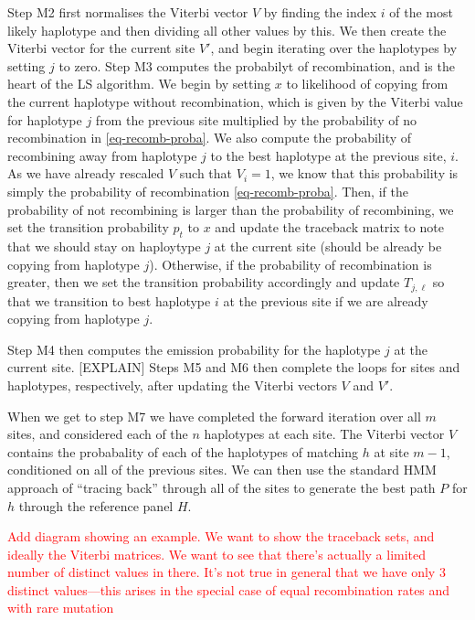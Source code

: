 \documentclass{article}
\begin{document}
Step M2 first normalises the Viterbi vector $V$ by finding the index $i$
of the most likely haplotype and then dividing all other values by this. We
then create the Viterbi vector for the current site $V'$, and begin
iterating over the haplotypes by setting $j$ to zero. Step M3 computes
the probabilyt of recombination, and is the heart of the LS algorithm.
We begin by setting $x$ to likelihood of copying from the current
haplotype without recombination, which is given by the Viterbi value
for haplotype $j$ from the previous site multiplied by the
probability of no recombination in \eqref{eq-recomb-proba}. We also
compute the probability of recombining away from haplotype $j$
to the best haplotype at the previous site, $i$. As we have already
rescaled $V$ such that $V_i = 1$, we know that this probability is
simply the probability of recombination \eqref{eq-recomb-proba}. Then,
if the probability of not recombining is larger than the probability
of recombining, we set the transition probability $p_t$ to $x$
and update the traceback matrix to note that we should stay on haploytype
$j$ at the current site (should be already be copying from haplotype $j$).
Otherwise, if the probability of recombination is greater, then we set the
transition probability accordingly and update $T_{j, \ell}$ so that we
transition to best haplotype $i$ at the previous site if we are already
copying from haplotype $j$.

Step M4 then computes the emission probability for the haplotype $j$
at the current site. [EXPLAIN] Steps M5 and M6 then complete the loops
for sites and haplotypes, respectively, after updating the Viterbi
vectors $V$ and $V'$.

When we get to step M7 we have completed the forward iteration over
all $m$ sites, and considered each of the $n$ haplotypes at each site.
The Viterbi vector $V$ contains the probabality of each of the haplotypes
of matching $h$ at site $m - 1$, conditioned on all of the previous sites.
We can then use the standard HMM approach of ``tracing back'' through
all of the sites to generate the best path $P$ for $h$ through the
reference panel $H$.

\textcolor{red}{Add diagram showing an example. We want to show the
traceback sets, and ideally the Viterbi matrices. We want to see that
there's actually a limited number of distinct values in there.
It's not true in general that we have only 3 distinct values---this arises
in the special case of equal recombination rates and with rare mutation}
\end{document}
